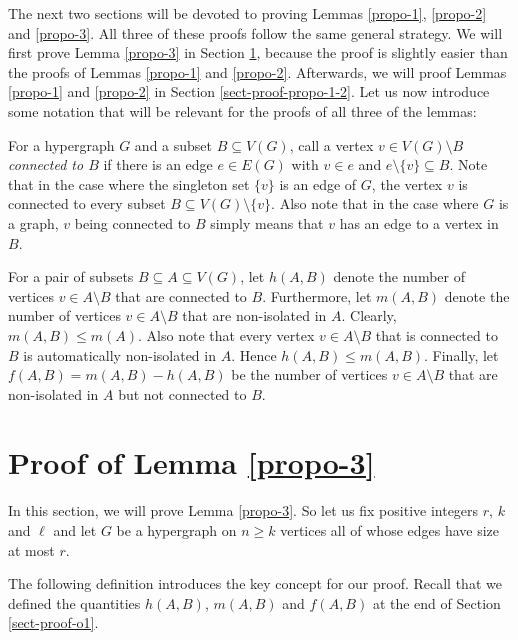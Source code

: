 The next two sections will be devoted to proving Lemmas \ref{propo-1}, \ref{propo-2} and \ref{propo-3}. All three of these proofs follow the same general strategy. We will first prove Lemma \ref{propo-3} in Section \ref{sect-proof-propo-3}, because the proof is slightly easier than the proofs of Lemmas \ref{propo-1} and \ref{propo-2}. Afterwards, we will proof Lemmas \ref{propo-1} and \ref{propo-2} in Section \ref{sect-proof-propo-1-2}. Let us now introduce some notation that will be relevant for the proofs of all three of the lemmas: 

For a hypergraph $G$ and a subset $B\subseteq V(G)$, call a vertex $v\in V(G)\setminus B$ \emph{connected to $B$} if there is an edge $e\in E(G)$ with $v\in e$ and $e\setminus \lbrace v\rbrace\subseteq B$. Note that in the case where the singleton set $\lbrace v\rbrace$ is an edge of $G$, the vertex $v$ is connected to every subset $B\subseteq V(G)\setminus \lbrace v\rbrace$. Also note that in the case where $G$ is a graph, $v$ being connected to $B$ simply means that $v$ has an edge to a vertex in $B$.

For a pair of subsets $B\subseteq A\subseteq V(G)$, let $h(A,B)$ denote the number of vertices $v\in A\setminus B$ that are connected to $B$. Furthermore, let $m(A,B)$ denote the number of vertices $v\in A\setminus B$ that are non-isolated in $A$. Clearly, $m(A,B)\leq m(A)$. Also note that every vertex $v\in A\setminus B$ that is connected to $B$ is automatically non-isolated in $A$. Hence $h(A,B)\leq m(A,B)$. Finally, let $f(A,B)=m(A,B)-h(A,B)$ be the number of vertices $v\in A\setminus B$ that are non-isolated in $A$ but not connected to $B$.

\section{Proof of Lemma \ref{propo-3}}\label{sect-proof-propo-3}

In this section, we will prove Lemma \ref{propo-3}. So let us fix positive integers $r$, $k$ and $\ell$ and let $G$ be a hypergraph on $n \geq k$ vertices all of whose edges have size at most $r$.

The following definition introduces the key concept for our proof. Recall that we defined the quantities $h(A,B)$, $m(A,B)$ and $f(A,B)$ at the end of Section \ref{sect-proof-o1}.

